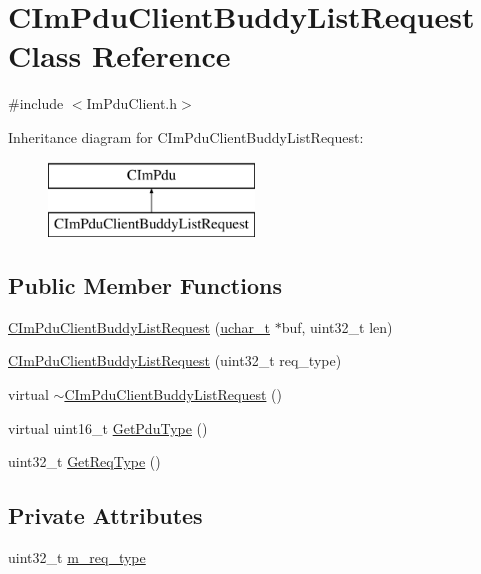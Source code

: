 \hypertarget{class_c_im_pdu_client_buddy_list_request}{}\section{C\+Im\+Pdu\+Client\+Buddy\+List\+Request Class Reference}
\label{class_c_im_pdu_client_buddy_list_request}


{\ttfamily \#include $<$Im\+Pdu\+Client.\+h$>$}

Inheritance diagram for C\+Im\+Pdu\+Client\+Buddy\+List\+Request\+:\begin{figure}[H]
\begin{center}
\leavevmode
\includegraphics[height=2.000000cm]{class_c_im_pdu_client_buddy_list_request}
\end{center}
\end{figure}
\subsection*{Public Member Functions}
\begin{DoxyCompactItemize}
\item 
\hyperlink{class_c_im_pdu_client_buddy_list_request_a066a1de9b22fdd0291e4a553fa6e9e3d}{C\+Im\+Pdu\+Client\+Buddy\+List\+Request} (\hyperlink{base_2ostype_8h_a124ea0f8f4a23a0a286b5582137f0b8d}{uchar\+\_\+t} $\ast$buf, uint32\+\_\+t len)
\item 
\hyperlink{class_c_im_pdu_client_buddy_list_request_afbc9648e275ab562453b99e5f2ae93de}{C\+Im\+Pdu\+Client\+Buddy\+List\+Request} (uint32\+\_\+t req\+\_\+type)
\item 
virtual \hyperlink{class_c_im_pdu_client_buddy_list_request_ae186bf2e2316e6c74b7a4510cdf2ce57}{$\sim$\+C\+Im\+Pdu\+Client\+Buddy\+List\+Request} ()
\item 
virtual uint16\+\_\+t \hyperlink{class_c_im_pdu_client_buddy_list_request_ad7a5b1ec5b3d36b7648855fde600082a}{Get\+Pdu\+Type} ()
\item 
uint32\+\_\+t \hyperlink{class_c_im_pdu_client_buddy_list_request_a435c0696134b02682fad90e70a28fd90}{Get\+Req\+Type} ()
\end{DoxyCompactItemize}
\subsection*{Private Attributes}
\begin{DoxyCompactItemize}
\item 
uint32\+\_\+t \hyperlink{class_c_im_pdu_client_buddy_list_request_ad2c68a1a8abf785f75f27624a27895a8}{m\+\_\+req\+\_\+type}
\end{DoxyCompactItemize}
